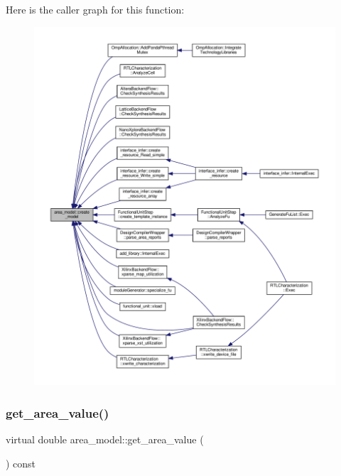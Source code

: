 Here is the caller graph for this function\+:
\nopagebreak
\begin{figure}[H]
\begin{center}
\leavevmode
\includegraphics[width=350pt]{d3/d16/classarea__model_a3babf6a1d22f03e4ee955134f3d87d73_icgraph}
\end{center}
\end{figure}
\mbox{\label{classarea__model_a390c12b38a4f2b1a137f6029d5494b97}} 
\subsubsection{\texorpdfstring{get\+\_\+area\+\_\+value()}{get\_area\_value()}}
{\footnotesize\ttfamily virtual double area\+\_\+model\+::get\+\_\+area\+\_\+value (\begin{DoxyParamCaption}{ }\end{DoxyParamCaption}) const\hspace{0.3cm}{\ttfamily [pure virtual]}}



